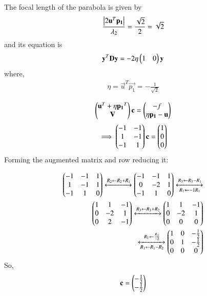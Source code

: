 \documentclass[journal,12pt,twocolumn]{IEEEtran}
\begin{document}
The focal length of the parabola is
given by
\begin{align}
\frac{\begin{vmatrix}2{\mathbf{u}}^T\mathbf{p_1}\end{vmatrix}}{\lambda_2 } = \frac{\sqrt{2}}{2} = \sqrt{2}
\end{align}
and its equation is
\begin{align}
\mathbf{y}^T\mathbf{D}\mathbf{y} = -2 \eta\begin{pmatrix}1 & 0 \end{pmatrix}\mathbf{y}
\end{align}
where,
\begin{align}
\eta = \vec{u}^T\vec{p_1} = - \frac{1}{\sqrt{2}}
\end{align}

\begin{align}
\begin{pmatrix}\mathbf{u}^T + \eta\mathbf{p_1}^T \\ \mathbf{V}\end{pmatrix}\mathbf{c} = \begin{pmatrix}-f \\ \eta\mathbf{p_1} - \mathbf{u}\end{pmatrix} 
\end{align}
\begin{align}
\implies \begin{pmatrix} -1 & -1   \\ 1 & -1 \\ -1 & 1 \end{pmatrix}\mathbf{c} = \begin{pmatrix}1 \\ 0 \\ 0\end{pmatrix}
\end{align}
Forming the augmented matrix and row reducing
it:



\begin{align}
\myvec{-1  &  -1 &  1 \\   1 & -1 &  1 \\  -1 & 1 & 0}  \label{2.30}
\xleftrightarrow[]{R_2 \leftarrow R_2+R_1  }
%
\myvec{
-1 & -1 & 1 \\ 0 & -2 & 1 \\ -1 & 1 & 0  
} 
\xleftrightarrow[R_1 \leftarrow -1R_1] {R_3 \leftarrow  R_3 - R_1}  \nonumber  \\
%
\myvec{
1 & 1 & -1 \\ 0 & -2 & 1 \\ 0 & 2 & -1 
}
\xleftrightarrow[]{R_3 \leftarrow R_3 +R_2 } 
%	
\myvec{
1 & 1 & -1 \\ 0 & -2 & 1 \\ 0 & 0 & 0 
} \nonumber   \\
\xleftrightarrow[R_1 \leftarrow R_1 -R_2]{R_1 \leftarrow \frac{R_1}{-2}} 
\myvec{
1 & 0 & -\frac{1}{2} \\ 0 & 1 & - \frac{1}{2} \\ 0 & 0 & 0
}
\end{align}
So,
\begin{align}
\mathbf{c} = \begin{pmatrix} -\frac{1}{2} \\ -\frac{1}{2}  \end{pmatrix} \label{2.31}
\end{align}
\end{document}
